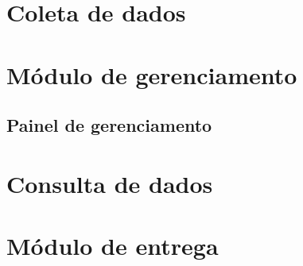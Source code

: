 \section{Coleta de dados}


\section{Módulo de gerenciamento}

\subsection{Painel de gerenciamento}

\section{Consulta de dados}

\section{Módulo de entrega}